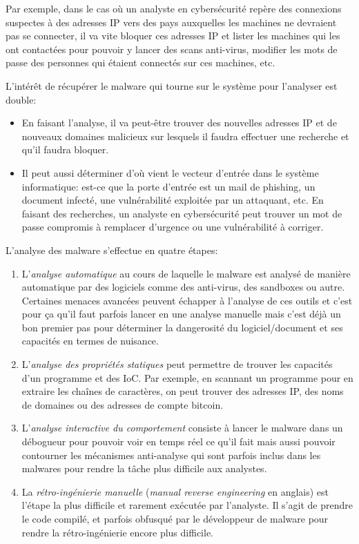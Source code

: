 \begin{example}
    \hspace{0.45cm} Par exemple, dans le cas où un analyste en cybersécurité repère des connexions suspectes à des adresses IP vers des pays auxquelles les machines ne devraient pas se connecter, il va vite bloquer ces adresses IP et lister les machines qui les ont contactées pour pouvoir y lancer des scans anti-virus, modifier les mots de passe des personnes qui étaient connectés sur ces machines, etc.

    L'intérêt de récupérer le malware qui tourne sur le système pour l'analyser est double:
    \begin{itemize}
        \item En faisant l'analyse, il va peut-être trouver des nouvelles adresses IP et de nouveaux domaines malicieux sur lesquels il faudra effectuer une recherche et qu'il faudra bloquer.
        \item Il peut aussi déterminer d'où vient le vecteur d'entrée dans le système informatique: est-ce que la porte d'entrée est un mail de phishing, un document infecté, une vulnérabilité exploitée par un attaquant, etc. En faisant des recherches, un analyste en cybersécurité peut trouver un mot de passe compromis à remplacer d'urgence ou une vulnérabilité à corriger.
    \end{itemize}
\end{example}

L'analyse des malware s'effectue en quatre étapes:
\begin{enumerate}
    \item L'\textit{analyse automatique} au cours de laquelle le malware est analysé de manière automatique par des logiciels comme des anti-virus, des sandboxes ou autre. Certaines menaces avancées peuvent échapper à l'analyse de ces outils et c'est pour ça qu'il faut parfois lancer en une analyse manuelle mais c'est déjà un bon premier pas pour déterminer la dangerosité du logiciel/document et ses capacités en termes de nuisance.
    \item L'\textit{analyse des propriétés statiques} peut permettre de trouver les capacités d'un programme et des IoC. Par exemple, en scannant un programme pour en extraire les chaînes de caractères, on peut trouver des adresses IP, des noms de domaines ou des adresses de compte bitcoin.
    \item L'\textit{analyse interactive du comportement} consiste à lancer le malware dans un débogueur pour pouvoir voir en temps réel ce qu'il fait mais aussi pouvoir contourner les mécanismes anti-analyse qui sont parfois inclus dans les malwares pour rendre la tâche plus difficile aux analystes.
    \item La \textit{rétro-ingénierie manuelle} (\textit{manual reverse engineering} en anglais) est l'étape la plus difficile et rarement exécutée par l'analyste. Il s'agit de prendre le code compilé, et parfois obfusqué par le développeur de malware pour rendre la rétro-ingénierie encore plus difficile.
\end{enumerate}





